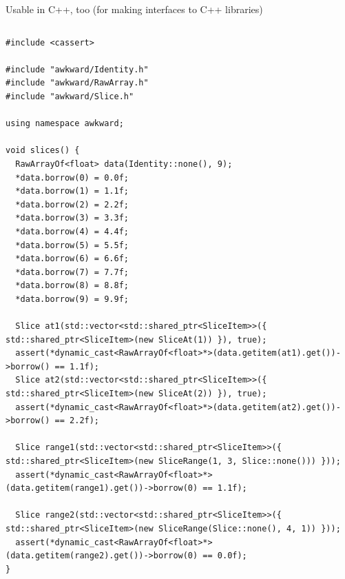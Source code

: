 \documentclass[aspectratio=169]{beamer}
\begin{document}
\begin{frame}[fragile]{Usable in C++, too (for making interfaces to C++ libraries)}
\tiny
\vspace{0.05 cm}
\begin{columns}
\begin{verbatim}
#include <cassert>

#include "awkward/Identity.h"
#include "awkward/RawArray.h"
#include "awkward/Slice.h"

using namespace awkward;

void slices() {
  RawArrayOf<float> data(Identity::none(), 9);
  *data.borrow(0) = 0.0f;
  *data.borrow(1) = 1.1f;
  *data.borrow(2) = 2.2f;
  *data.borrow(3) = 3.3f;
  *data.borrow(4) = 4.4f;
  *data.borrow(5) = 5.5f;
  *data.borrow(6) = 6.6f;
  *data.borrow(7) = 7.7f;
  *data.borrow(8) = 8.8f;
  *data.borrow(9) = 9.9f;

  Slice at1(std::vector<std::shared_ptr<SliceItem>>({ std::shared_ptr<SliceItem>(new SliceAt(1)) }), true);
  assert(*dynamic_cast<RawArrayOf<float>*>(data.getitem(at1).get())->borrow() == 1.1f);
  Slice at2(std::vector<std::shared_ptr<SliceItem>>({ std::shared_ptr<SliceItem>(new SliceAt(2)) }), true);
  assert(*dynamic_cast<RawArrayOf<float>*>(data.getitem(at2).get())->borrow() == 2.2f);

  Slice range1(std::vector<std::shared_ptr<SliceItem>>({ std::shared_ptr<SliceItem>(new SliceRange(1, 3, Slice::none())) }));
  assert(*dynamic_cast<RawArrayOf<float>*>(data.getitem(range1).get())->borrow(0) == 1.1f);

  Slice range2(std::vector<std::shared_ptr<SliceItem>>({ std::shared_ptr<SliceItem>(new SliceRange(Slice::none(), 4, 1)) }));
  assert(*dynamic_cast<RawArrayOf<float>*>(data.getitem(range2).get())->borrow(0) == 0.0f);
}
\end{verbatim}
\end{columns}
\end{frame}
\end{document}
